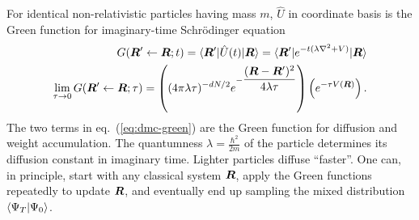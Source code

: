 For identical non-relativistic particles having mass $m$, $\hat{U}$ in coordinate basis is the Green function for imaginary-time Schr\"odinger equation
\begin{align}
G(\boldsymbol{R}'\leftarrow\boldsymbol{R};t) = \braket{\boldsymbol{R}'|\hat{U}(t)|\boldsymbol{R}} =  \braket{\boldsymbol{R}'|e^{-t(\lambda \nabla^2+V)}|\boldsymbol{R}}\nonumber \\ \lim\limits_{\tau\rightarrow 0} G(\boldsymbol{R}'\leftarrow\boldsymbol{R};\tau) =
\left(
(4\pi\lambda\tau)^{-dN/2}e^{-\dfrac{(\boldsymbol{R}-\boldsymbol{R}')^2}{4\lambda\tau}}
\right)
\left(
e^{-\tau V(\boldsymbol{R})}
\right). \label{eq:dmc-green}
\end{align}
The two terms in eq.~(\ref{eq:dmc-green}) are the Green function for diffusion and weight accumulation.
The quantumness $\lambda=\frac{\hbar^2}{2m}$ of the particle determines its diffusion constant in imaginary time. Lighter particles diffuse ``faster''. One can, in principle, start with any classical system $\boldsymbol{R}$, apply the Green functions repeatedly to update $\boldsymbol{R}$, and eventually end up sampling the mixed distribution $\braket{\Psi_T|\Psi_0}$.

